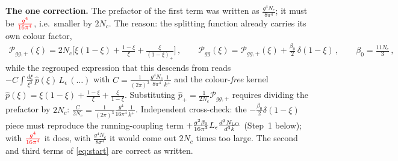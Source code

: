 \documentclass[10pt]{article}
\newcommand{\Leps}{L_{\epsilon}}
\begin{document}
\textbf{The one correction.} The prefactor of the first term was written as
$\frac{g^{4}N_{c}}{8\pi^{4}}$; it must be ${\color{red}\frac{g^{4}}{16\pi^{4}}}$, i.e.\ smaller
by $2N_{c}$. The reason: the splitting function already carries its own colour factor,
\begin{align}\label{eq:pgg}
\mathcal P_{gg,+}(\xi)=2N_{c}\Big[\xi(1-\xi)+\frac{1-\xi}{\xi}+\frac{\xi}{(1-\xi)_{+}}\Big]\,,
\qquad
\mathcal P_{gg}(\xi)=\mathcal P_{gg,+}(\xi)+\frac{\beta_{0}}{2}\,\delta(1-\xi)\,,\qquad
\beta_{0}=\frac{11N_{c}}{3}\,,
\end{align}
while the regrouped expression that this descends from reads
$-C\int\frac{d\xi}{\xi^{2}}\,\hat p(\xi)\,\Leps\,(\dots)$ with
$C=\frac{1}{(2\pi)^{3}}\frac{g^{4}N_{c}}{8\pi^{4}}\frac{1}{k^{+}}$ and the colour-\emph{free}
kernel $\hat p(\xi)=\xi(1-\xi)+\frac{1-\xi}{\xi}+\frac{\xi}{1-\xi}$. Substituting
$\hat p_{+}=\frac{1}{2N_{c}}\mathcal P_{gg,+}$ requires dividing the prefactor by $2N_{c}$:
$\frac{C}{2N_{c}}=\frac{1}{(2\pi)^{3}}\frac{g^{4}}{16\pi^{4}}\frac{1}{k^{+}}$. Independent
cross-check: the $-\frac{\beta_{0}}{2}\delta(1-\xi)$ piece must reproduce the running-coupling
term $+\frac{g^{2}\beta_{0}}{16\pi^{2}}\Leps\frac{d^{3}N_{\rm LO}}{d^{3}k}$ (Step~1 below);
with ${\color{red}\frac{g^{4}}{16\pi^{4}}}$ it does, with $\frac{g^{4}N_{c}}{8\pi^{4}}$ it
would come out $2N_{c}$ times too large. The second and third terms of \eqref{eq:start} are
correct as written.
\end{document}
